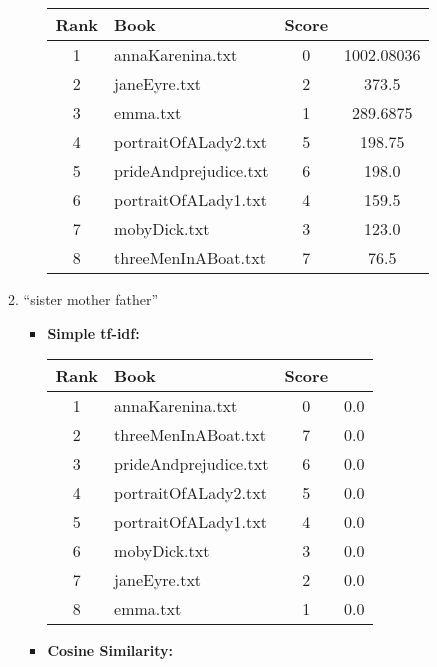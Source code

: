 \documentclass[a4paper,11pt,oneside]{book}
\begin{document}
\begin{enumerate}
\begin{enumerate}
\begin{itemize}
										\begin{tabular}{clcc}
											\toprule
												\textbf{Rank} & \textbf{Book} & \textbf{Score}\\
											\hline
												1	&	annaKarenina.txt	&	0	&	1002.08036	\\
												2	&	janeEyre.txt	&	2	&	373.5	\\
												3	&	emma.txt	&	1	&	289.6875	\\
												4	&	portraitOfALady2.txt	&	5	&	198.75	\\
												5	&	prideAndprejudice.txt	&	6	&	198.0	\\
												6	&	portraitOfALady1.txt	&	4	&	159.5	\\
												7	&	mobyDick.txt	&	3	&	123.0	\\
												8	&	threeMenInABoat.txt	&	7	&	76.5	\\
											\bottomrule
										\end{tabular}\newline
						\end{itemize}
			\item ``sister mother father''
						\begin{itemize}
							\item \textbf{Simple tf-idf:}
							
										\begin{tabular}{clcc}
											\toprule
												\textbf{Rank} & \textbf{Book} & \textbf{Score}\\
											\hline
												1	&	annaKarenina.txt	&	0	&	0.0	\\
												2	&	threeMenInABoat.txt	&	7	&	0.0	\\
												3	&	prideAndprejudice.txt	&	6	&	0.0	\\
												4	&	portraitOfALady2.txt	&	5	&	0.0	\\
												5	&	portraitOfALady1.txt	&	4	&	0.0	\\
												6	&	mobyDick.txt	&	3	&	0.0	\\
												7	&	janeEyre.txt	&	2	&	0.0	\\
												8	&	emma.txt	&	1	&	0.0	\\
											\bottomrule
										\end{tabular}\newline
							\item \textbf{Cosine Similarity:}
							

\end{itemize}
\end{enumerate}
\end{enumerate}
\end{document}
